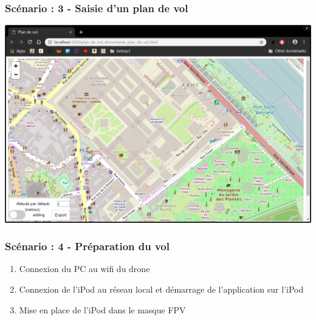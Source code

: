 \documentclass{beamer}
\begin{document}


	\begin{frame}
		\begin{center}
		\frametitle{Scénario : 3 - Saisie d'un plan de vol}

        \includegraphics[scale=0.28]{map-GUI.png}
		\end{center}
	\end{frame}
	


	\begin{frame}
		\begin{center}
		\frametitle{Scénario : 4 - Préparation du vol}
        \begin{enumerate}
		    \item Connexion du PC au wifi du drone
		    \item Connexion de l'iPod au réseau local et démarrage de l'application sur l'iPod
		    \item Mise en place de l'iPod dans le masque FPV
		\end{enumerate}
		
		\end{center}
	\end{frame}
	
\end{document}
